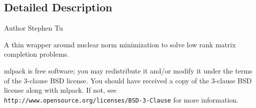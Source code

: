 \subsection{Detailed Description}
\begin{DoxyAuthor}{Author}
Stephen Tu
\end{DoxyAuthor}
A thin wrapper around nuclear norm minimization to solve low rank matrix completion problems.

mlpack is free software; you may redistribute it and/or modify it under the terms of the 3-\/clause B\+SD license. You should have received a copy of the 3-\/clause B\+SD license along with mlpack. If not, see {\tt http\+://www.\+opensource.\+org/licenses/\+B\+S\+D-\/3-\/\+Clause} for more information. 